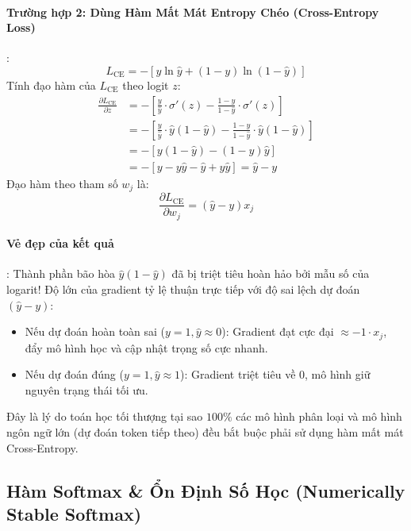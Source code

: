 \paragraph{Trường hợp 2: Dùng Hàm Mất Mát Entropy Chéo (Cross-Entropy Loss)}:
\begin{equation}
L_{\text{CE}} = - \left[ y \ln \hat{y} + (1 - y) \ln (1 - \hat{y}) \right]
\label{eq:cross-entropy-def}
\end{equation}
Tính đạo hàm của $L_{\text{CE}}$ theo logit $z$:
\begin{align}
\frac{\partial L_{\text{CE}}}{\partial z} &= - \left[ \frac{y}{\hat{y}} \cdot \sigma'(z) - \frac{1 - y}{1 - \hat{y}} \cdot \sigma'(z) \right] \nonumber \\
&= - \left[ \frac{y}{\hat{y}} \cdot \hat{y}(1 - \hat{y}) - \frac{1 - y}{1 - \hat{y}} \cdot \hat{y}(1 - \hat{y}) \right] \nonumber \\
&= - \left[ y(1 - \hat{y}) - (1 - y)\hat{y} \right] \nonumber \\
&= - [y - y\hat{y} - \hat{y} + y\hat{y}] = \hat{y} - y
\label{eq:cross-entropy-clean-gradient}
\end{align}
Đạo hàm theo tham số $w_j$ là:
\begin{equation}
\frac{\partial L_{\text{CE}}}{\partial w_j} = (\hat{y} - y) x_j
\end{equation}

\paragraph{Vẻ đẹp của kết quả}:
Thành phần bão hòa $\hat{y}(1 - \hat{y})$ đã bị triệt tiêu hoàn hảo bởi mẫu số của logarit! 
Độ lớn của gradient tỷ lệ thuận trực tiếp với độ sai lệch dự đoán $(\hat{y} - y)$:
\begin{itemize}
  \item Nếu dự đoán hoàn toàn sai ($y = 1, \hat{y} \approx 0$): Gradient đạt cực đại $\approx -1 \cdot x_j$, đẩy mô hình học và cập nhật trọng số cực nhanh.
  \item Nếu dự đoán đúng ($y = 1, \hat{y} \approx 1$): Gradient triệt tiêu về $0$, mô hình giữ nguyên trạng thái tối ưu.
\end{itemize}

Đây là lý do toán học tối thượng tại sao $100\%$ các mô hình phân loại và mô hình ngôn ngữ lớn (dự đoán token tiếp theo) đều bắt buộc phải sử dụng hàm mất mát Cross-Entropy.

\subsection{Hàm Softmax \& Ổn Định Số Học (Numerically Stable Softmax)}

